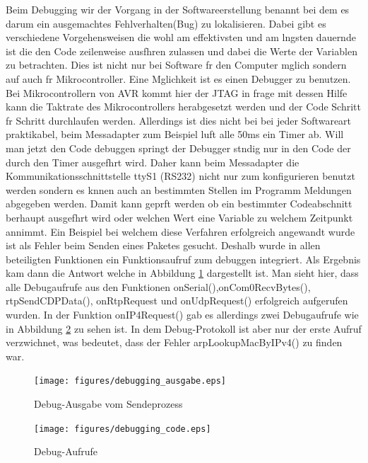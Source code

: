 \documentclass[a4paper]{book}%
\begin{document}
Beim Debugging wir der Vorgang in der Softwareerstellung benannt bei dem es darum ein ausgemachtes Fehlverhalten(Bug) zu lokalisieren. Dabei gibt es verschiedene Vorgehensweisen die wohl am effektivsten und am lngsten dauernde ist die den Code zeilenweise ausfhren zulassen und dabei die Werte der Variablen zu betrachten. Dies ist nicht nur bei Software fr den Computer mglich sondern auf auch fr Mikrocontroller. Eine Mglichkeit ist es einen Debugger zu benutzen. Bei Mikrocontrollern von AVR kommt hier der JTAG in frage mit dessen Hilfe kann die Taktrate des Mikrocontrollers herabgesetzt werden und der Code Schritt fr Schritt durchlaufen werden. Allerdings ist dies nicht bei bei jeder Softwareart praktikabel, beim Messadapter zum Beispiel luft alle 50ms ein Timer ab. Will man jetzt den Code debuggen springt der Debugger stndig nur in den Code der durch den Timer ausgefhrt wird. Daher kann beim Messadapter die Kommunikationsschnittstelle ttyS1 (RS232) nicht nur zum konfigurieren benutzt werden sondern es knnen auch an bestimmten Stellen im  Programm Meldungen abgegeben werden. Damit kann geprft werden ob ein bestimmter Codeabschnitt berhaupt ausgefhrt wird oder welchen Wert eine Variable zu welchem Zeitpunkt annimmt. Ein Beispiel bei welchem diese Verfahren erfolgreich angewandt wurde ist als Fehler beim Senden eines Paketes gesucht. Deshalb wurde in allen beteiligten Funktionen ein Funktionsaufruf zum debuggen integriert. Als Ergebnis kam dann die Antwort welche in Abbildung \ref{fig:debug-ausgabe} dargestellt ist. Man sieht hier, dass alle Debugaufrufe aus den Funktionen onSerial(),onCom0RecvBytes(), rtpSendCDPData(), onRtpRequest und onUdpRequest() erfolgreich aufgerufen wurden. In der Funktion onIP4Request() gab es allerdings zwei Debugaufrufe wie in Abbildung \ref{fig:debug-code} zu sehen ist. In dem Debug-Protokoll ist aber nur der erste Aufruf verzwichnet, was bedeutet, dass der Fehler arpLookupMacByIPv4() zu finden war.


\vspace{1 cm}
\begin{figure}[H]
	\centering
	\texttt{[image: figures/debugging\_ausgabe.eps]}
	\caption{Debug-Ausgabe vom Sendeprozess}
	\label{fig:debug-ausgabe}
\end{figure}
\vspace{1 cm}


\vspace{1 cm}
\begin{figure}[H]
	\centering
	\texttt{[image: figures/debugging\_code.eps]}
	\caption{Debug-Aufrufe}
	\label{fig:debug-code}
\end{figure}
\vspace{1 cm}
\end{document}
